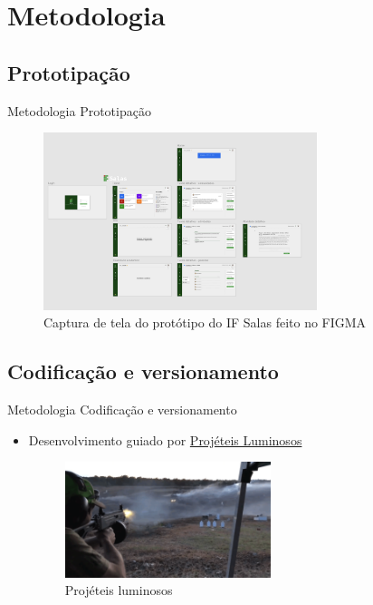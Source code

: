 \AtBeginSection[]{
	\begin{frame}
		\frametitle{}
		\tableofcontents[currentsection]
	\end{frame}
}

\section{Metodologia}

\subsection{Prototipação}
\begin{frame}{Metodologia}
	{Prototipação}
	\begin{figure}
		\includegraphics[width=8cm]{images/figma-proto.png}
		\caption{Captura de tela do protótipo do IF Salas feito no FIGMA}
	\end{figure}
\end{frame}

\subsection{Codificação e versionamento}
\begin{frame}{Metodologia}
	{Codificação e versionamento}
	\begin{itemize}[<+->]
		\item Desenvolvimento guiado por \href{https://www.artima.com/articles/tracer-bullets-and-prototypes}{Projéteis Luminosos}
		\begin{figure}[h]
			\includegraphics[width=6cm]{images/tracer-bullets.png}
			\caption{Projéteis luminosos}
		\end{figure}
	\end{itemize}
\end{frame}

